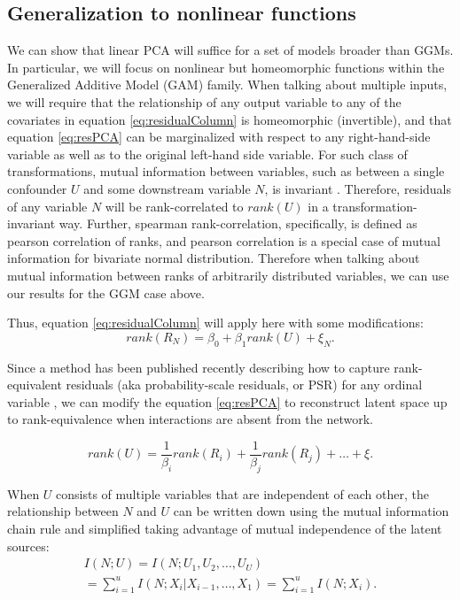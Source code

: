 \documentclass{article}
\begin{document}
\subsection{Generalization to nonlinear functions}
We can show that linear PCA will suffice for a set of models broader than GGMs.  In particular, we will focus on nonlinear but homeomorphic functions within the Generalized Additive Model (GAM) family.  When talking about multiple inputs, we will require that the relationship of any output variable to any of the covariates in equation \ref{eq:residualColumn} is homeomorphic (invertible), and that equation \ref{eq:resPCA} can be marginalized with respect to any right-hand-side variable as well as to the original left-hand side variable.  For such class of transformations, mutual information between variables, such as between a single confounder $U$ and some downstream variable $N$, is invariant \cite{kraskov_estimating_2004}.  Therefore, residuals of any variable $N$ will be rank-correlated to $rank(U)$ in a transformation-invariant way. Further, spearman rank-correlation, specifically, is defined as pearson correlation of ranks, and pearson correlation is a special case of mutual information for bivariate normal distribution.  Therefore when talking about mutual information between ranks of arbitrarily distributed variables, we can use our results for the GGM case above.

Thus, equation \ref{eq:residualColumn} will apply here with some modifications:
\begin{equation}
rank(R_N) = \beta_0 + \beta_1 rank(U) + \xi_N.
\label{eq:residualColumnRank}
\end{equation}

Since a method has been published recently describing how to capture rank-equivalent residuals (aka probability-scale residuals, or PSR) for any ordinal variable \cite{shepherd_probability-scale_2016}, we can modify the equation \ref{eq:resPCA} to reconstruct latent space up to rank-equivalence when interactions are absent from the network.

\begin{equation}
rank(U) = \frac{1}{\beta_i} rank(R_i) + \frac{1}{\beta_j} rank(R_j) + \dots + \xi. 
\label{resPcaGam}
\end{equation}

When $U$ consists of multiple variables that are independent of each other, the relationship between $N$ and $U$ can be written down using the mutual information chain rule \cite{mackay_information_2003} and simplified taking advantage of mutual independence of the latent sources:
\begin{equation}
\label{eq:rankSetRelationship}
\begin{split}
I(N; U) = I(N; U_1, U_2, \dots, U_U) \\= \sum_{i=1}^{u}{I(N; X_i | X_{i-1}, \dots, X_1)} = \sum_{i=1}^{u}{I(N; X_i)}.
\end{split}
\end{equation}
\end{document}
